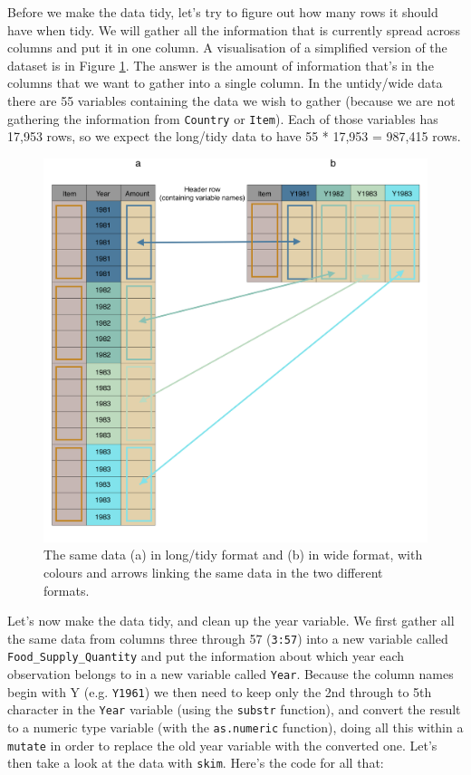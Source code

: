 \documentclass[]{book}
\begin{document}
Before we make the data tidy, let's try to figure out how many rows it should have when tidy. We will gather all the information that is currently spread across columns and put it in one column. A visualisation of a simplified version of the dataset is in Figure \ref{fig:long-wide}. The answer is the amount of information that's in the columns that we want to gather into a single column. In the untidy/wide data there are 55 variables containing the data we wish to gather (because we are not gathering the information from \texttt{Country} or \texttt{Item}). Each of those variables has 17,953 rows, so we expect the long/tidy data to have 55 * 17,953 = 987,415 rows.

\begin{figure}

{\centering \includegraphics[width=1\linewidth]{images/long_wide} 

}

\caption{The same data (a) in long/tidy format and (b) in wide format, with colours and arrows linking the same data in the two different formats.}\label{fig:long-wide}
\end{figure}

Let's now make the data tidy, and clean up the year variable. We first gather all the same data from columns three through 57 (\texttt{3:57}) into a new variable called \texttt{Food\_Supply\_Quantity} and put the information about which year each observation belongs to in a new variable called \texttt{Year}. Because the column names begin with Y (e.g. \texttt{Y1961}) we then need to keep only the 2nd through to 5th character in the \texttt{Year} variable (using the \texttt{substr} function), and convert the result to a numeric type variable (with the \texttt{as.numeric} function), doing all this within a \texttt{mutate} in order to replace the old year variable with the converted one. Let's then take a look at the data with \texttt{skim}. Here's the code for all that:
\end{document}
